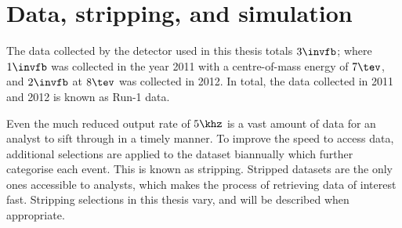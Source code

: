 \section{Data, stripping, and simulation}

The data collected by the \lhcb detector used in this thesis totals $3\invfb$; where $1\invfb$ was
collected in the year 2011 with a centre-of-mass energy of $7\tev$, and $2\invfb$ at $8\tev$ was
collected in 2012.
In total, the data collected in 2011 and 2012 is known as Run-1 data.

Even the much reduced \hlttwo output rate of $5\khz$ is a vast amount of data for an
analyst to sift through in a timely manner.
To improve the speed to access data, additional selections are applied to the dataset biannually
which further categorise each event.
This is known as stripping.
Stripped datasets are the only ones accessible to analysts, which makes the process of retrieving
data of interest fast.
Stripping selections in this thesis vary, and will be described when appropriate.





